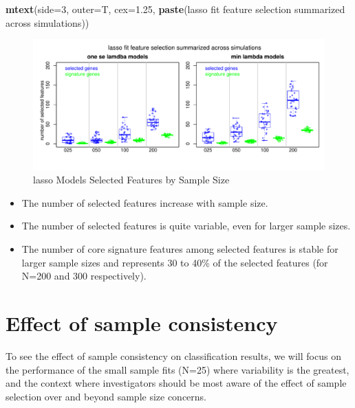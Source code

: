 \documentclass[
]{book}
\newenvironment{Shaded}{\begin{snugshade}}{\end{snugshade}}
\newcommand{\DataTypeTok}[1]{\textcolor[rgb]{0.13,0.29,0.53}{#1}}
\newcommand{\DecValTok}[1]{\textcolor[rgb]{0.00,0.00,0.81}{#1}}
\newcommand{\FloatTok}[1]{\textcolor[rgb]{0.00,0.00,0.81}{#1}}
\newcommand{\KeywordTok}[1]{\textcolor[rgb]{0.13,0.29,0.53}{\textbf{#1}}}
\newcommand{\NormalTok}[1]{#1}
\newcommand{\StringTok}[1]{\textcolor[rgb]{0.31,0.60,0.02}{#1}}
\begin{document}
\begin{Shaded}
\begin{Highlighting}[]
\KeywordTok{mtext}\NormalTok{(}\DataTypeTok{side=}\DecValTok{3}\NormalTok{, }\DataTypeTok{outer=}\NormalTok{T, }\DataTypeTok{cex=}\FloatTok{1.25}\NormalTok{, }\KeywordTok{paste}\NormalTok{(}\StringTok{\textquotesingle{}lasso fit feature selection summarized across simulations\textquotesingle{}}\NormalTok{))}
\end{Highlighting}
\end{Shaded}

\begin{figure}
\centering
\includegraphics{Static/figures/hcc5hmC-glmnetSuite-lasso-simRes-features-OverSim-1.pdf}
\caption{\label{fig:hcc5hmC-glmnetSuite-lasso-simRes-features-OverSim}lasso Models Selected Features by Sample Size}
\end{figure}

\begin{itemize}
\item
  The number of selected features increase with sample size.
\item
  The number of selected features is quite variable, even for larger sample sizes.
\item
  The number of core signature features among selected features is stable for larger sample
  sizes and represents 30 to 40\% of the selected features (for N=200 and 300 respectively).
\end{itemize}

\hypertarget{effect-of-sample-consistency}{%
\section{Effect of sample consistency}\label{effect-of-sample-consistency}}

To see the effect of sample consistency on classification results, we will
focus on the performance of the small sample fits (N=25) where variability is the
greatest, and the context where investigators should be most aware of the
effect of sample selection over and beyond sample size concerns.
\end{document}
